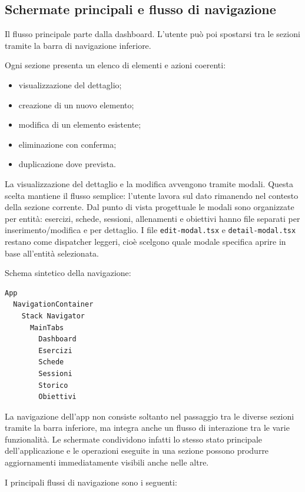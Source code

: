 \documentclass[11pt,a4paper]{article}
\begin{document}
\subsection{Schermate principali e flusso di navigazione}

Il flusso principale parte dalla dashboard. L'utente può poi spostarsi tra le sezioni tramite la barra di navigazione inferiore.

Ogni sezione presenta un elenco di elementi e azioni coerenti:

\begin{itemize}
  \item visualizzazione del dettaglio;
  \item creazione di un nuovo elemento;
  \item modifica di un elemento esistente;
  \item eliminazione con conferma;
  \item duplicazione dove prevista.
\end{itemize}

La visualizzazione del dettaglio e la modifica avvengono tramite modali. Questa scelta mantiene il flusso semplice: l'utente lavora sul dato rimanendo nel contesto della sezione corrente. Dal punto di vista progettuale le modali sono organizzate per entità: esercizi, schede, sessioni, allenamenti e obiettivi hanno file separati per inserimento/modifica e per dettaglio. I file \texttt{edit-modal.tsx} e \texttt{detail-modal.tsx} restano come dispatcher leggeri, cioè scelgono quale modale specifica aprire in base all'entità selezionata.

Schema sintetico della navigazione:

\begin{lstlisting}
App
  NavigationContainer
    Stack Navigator
      MainTabs
        Dashboard
        Esercizi
        Schede
        Sessioni
        Storico
        Obiettivi
\end{lstlisting}


La navigazione dell'app non consiste soltanto nel passaggio tra le diverse sezioni tramite la barra inferiore, ma integra anche un flusso di interazione tra le varie funzionalità. Le schermate condividono infatti lo stesso stato principale dell'applicazione e le operazioni eseguite in una sezione possono produrre aggiornamenti immediatamente visibili anche nelle altre.

I principali flussi di navigazione sono i seguenti:
\end{document}
